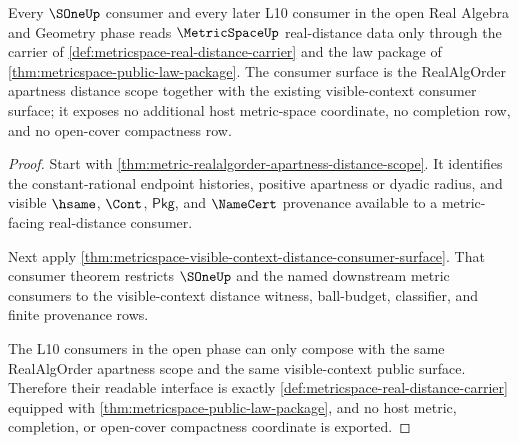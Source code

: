 \begin{theorem}
\label{thm:metricspace-open-phase-consumer-interface}
Every $\SOneUp$ consumer and every later L10 consumer in the open Real
Algebra and Geometry phase reads $\MetricSpaceUp$ real-distance data only
through the carrier of \autoref{def:metricspace-real-distance-carrier} and the
law package of \autoref{thm:metricspace-public-law-package}. The consumer
surface is the RealAlgOrder apartness distance scope together with the existing
visible-context consumer surface; it exposes no additional host metric-space
coordinate, no completion row, and no open-cover compactness row.
\end{theorem}
\begin{proof}
Start with
\autoref{thm:metric-realalgorder-apartness-distance-scope}. It identifies the
constant-rational endpoint histories, positive apartness or dyadic radius, and
visible $\hsame$, $\Cont$, $\mathsf{Pkg}$, and $\NameCert$ provenance available
to a metric-facing real-distance consumer.

Next apply
\autoref{thm:metricspace-visible-context-distance-consumer-surface}. That
consumer theorem restricts $\SOneUp$ and the named downstream metric consumers
to the visible-context distance witness, ball-budget, classifier, and finite
provenance rows.

The L10 consumers in the open phase can only compose with the same
RealAlgOrder apartness scope and the same visible-context public surface.
Therefore their readable interface is exactly
\autoref{def:metricspace-real-distance-carrier} equipped with
\autoref{thm:metricspace-public-law-package}, and no host metric,
completion, or open-cover compactness coordinate is exported.
\end{proof}

